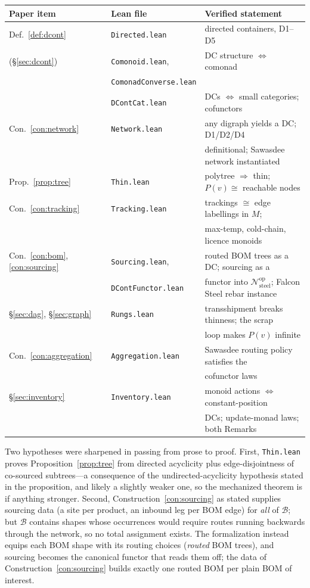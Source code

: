 \documentclass[11pt,a4paper]{article}
\newcommand{\N}{\mathcal{N}}
\newcommand{\B}{\mathcal{B}}
\theoremstyle{plain}
\theoremstyle{definition}
\theoremstyle{remark}
\begin{document}
\begin{center}
\small
\begin{tabular}{lll}
\toprule
Paper item & Lean file & Verified statement \\
\midrule
Def.~\ref{def:dcont} & \texttt{Directed.lean} & directed containers, D1--D5 \\
(§\ref{sec:dcont}) & \texttt{Comonoid.lean}, & DC structure $\Leftrightarrow$ comonad \\
 & \texttt{ComonadConverse.lean} & \\
 & \texttt{DContCat.lean} & DCs $\Leftrightarrow$ small categories; cofunctors \\
Con.~\ref{con:network} & \texttt{Network.lean} & any digraph yields a DC; D1/D2/D4 \\
 & & definitional; Sawasdee network instantiated \\
Prop.~\ref{prop:tree} & \texttt{Thin.lean} & polytree $\Rightarrow$ thin; $P(v) \cong$ reachable nodes \\
Con.~\ref{con:tracking} & \texttt{Tracking.lean} & trackings $\cong$ edge labellings in $M$; \\
 & & max-temp, cold-chain, licence monoids \\
Con.~\ref{con:bom}, \ref{con:sourcing} & \texttt{Sourcing.lean}, & routed BOM trees as a DC; sourcing as a \\
 & \texttt{DContFunctor.lean} & functor into $\N_{\mathrm{steel}}^{\mathrm{op}}$; Falcon Steel rebar instance \\
§\ref{sec:dag}, §\ref{sec:graph} & \texttt{Rungs.lean} & transshipment breaks thinness; the scrap \\
 & & loop makes $P(v)$ infinite \\
Con.~\ref{con:aggregation} & \texttt{Aggregation.lean} & Sawasdee routing policy satisfies the \\
 & & cofunctor laws \\
§\ref{sec:inventory} & \texttt{Inventory.lean} & monoid actions $\Leftrightarrow$ constant-position \\
 & & DCs; update-monad laws; both Remarks \\
\bottomrule
\end{tabular}
\end{center}

Two hypotheses were sharpened in passing from prose to proof.
First, \texttt{Thin.lean} proves Proposition~\ref{prop:tree} from
directed acyclicity plus edge-disjointness of co-sourced subtrees---a
consequence of the undirected-acyclicity hypothesis stated in the
proposition, and likely a slightly weaker one, so the mechanized
theorem is if anything stronger. Second,
Construction~\ref{con:sourcing} as stated supplies sourcing data
(a site per product, an inbound leg per BOM edge) for \emph{all} of
$\B$; but $\B$ contains shapes whose occurrences would require routes
running backwards through the network, so no total assignment exists.
The formalization instead equips each BOM shape with its routing
choices (\emph{routed} BOM trees), and sourcing becomes the canonical
functor that reads them off; the data of
Construction~\ref{con:sourcing} builds exactly one routed BOM per
plain BOM of interest.
\end{document}
